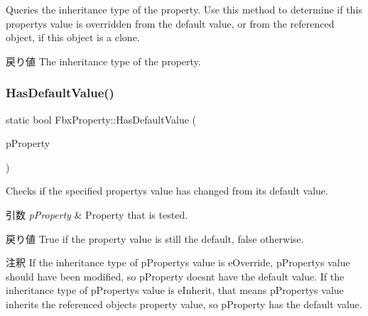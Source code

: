 Queries the inheritance type of the property. Use this method to determine if this property\textquotesingle{}s value is overridden from the default value, or from the referenced object, if this object is a clone. \begin{DoxyReturn}{戻り値}
The inheritance type of the property. 
\end{DoxyReturn}
\mbox{\label{class_fbx_property_aa040d85cda5816e4937a348e47357a61}} 
\subsubsection{\texorpdfstring{Has\+Default\+Value()}{HasDefaultValue()}}
{\footnotesize\ttfamily static bool Fbx\+Property\+::\+Has\+Default\+Value (\begin{DoxyParamCaption}\item[{\hyperlink{class_fbx_property}{Fbx\+Property} \&}]{p\+Property }\end{DoxyParamCaption})\hspace{0.3cm}{\ttfamily [static]}}

Checks if the specified property\textquotesingle{}s value has changed from its default value. 
\begin{DoxyParams}{引数}
{\em p\+Property} & Property that is tested. \\
\hline
\end{DoxyParams}
\begin{DoxyReturn}{戻り値}
{\ttfamily True} if the property value is still the default, {\ttfamily false} otherwise. 
\end{DoxyReturn}
\begin{DoxyRemark}{注釈}
If the inheritance type of p\+Property\textquotesingle{}s value is e\+Override, p\+Property\textquotesingle{}s value should have been modified, so p\+Property doesn\textquotesingle{}t have the default value. If the inheritance type of p\+Property\textquotesingle{}s value is e\+Inherit, that means p\+Property\textquotesingle{}s value inherits the referenced object\textquotesingle{}s property value, so p\+Property has the default value. 
\end{DoxyRemark}
\mbox{\label{class_fbx_property_a0f55c44acd2069128f85063eb2c04d47}} 
